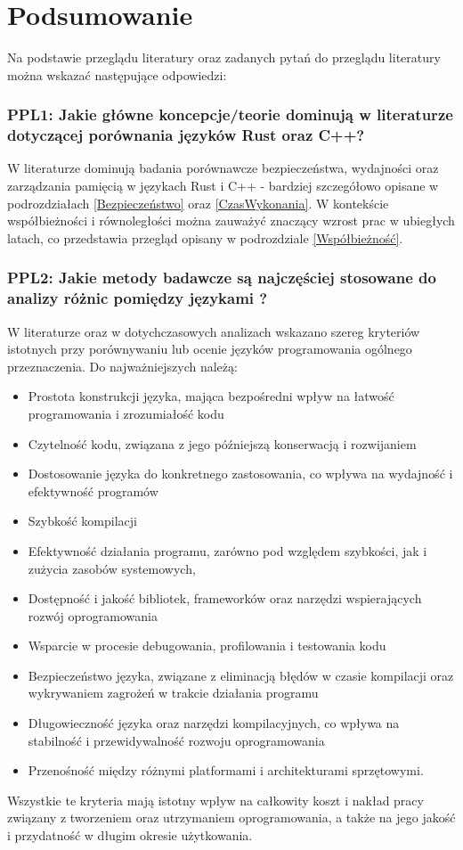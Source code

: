 \section{Podsumowanie}
Na podstawie przeglądu literatury oraz zadanych pytań do przeglądu literatury można wskazać następujące odpowiedzi:
\subsubsection{PPL1: Jakie główne koncepcje/teorie dominują w literaturze dotyczącej porównania języków Rust oraz C++?}
W literaturze dominują badania porównawcze bezpieczeństwa, wydajności oraz zarządzania pamięcią w językach Rust i C++ - bardziej szczegółowo opisane w podrozdziałach \ref{Bezpieczeństwo} oraz \ref{CzasWykonania}. W kontekście współbieżności i równoległości można zauważyć znaczący wzrost prac w ubiegłych latach, co przedstawia przegląd opisany w podrozdziale \ref{Współbieżność}.

\subsubsection{PPL2: Jakie metody badawcze są najczęściej stosowane do analizy różnic pomiędzy językami ?}
W literaturze oraz w dotychczasowych analizach \cite{LanguageComparison_1,LanguageComparison_2,LanguageComparison_3,LanguageComparison_4} wskazano szereg kryteriów istotnych przy porównywaniu lub ocenie języków programowania ogólnego przeznaczenia. Do najważniejszych należą: 
    \begin{itemize}
        \item Prostota konstrukcji języka, mająca bezpośredni wpływ na łatwość programowania i zrozumiałość kodu
        \item Czytelność kodu, związana z jego późniejszą konserwacją i rozwijaniem
        \item Dostosowanie języka do konkretnego zastosowania, co wpływa na wydajność i efektywność programów
        \item Szybkość kompilacji
        \item Efektywność działania programu, zarówno pod względem szybkości, jak i zużycia zasobów systemowych,
        \item Dostępność i jakość bibliotek, frameworków oraz narzędzi wspierających rozwój oprogramowania
        \item Wsparcie w procesie debugowania, profilowania i testowania kodu
        \item Bezpieczeństwo języka, związane z eliminacją błędów w czasie kompilacji oraz wykrywaniem zagrożeń w trakcie działania programu
        \item Długowieczność języka oraz narzędzi kompilacyjnych, co wpływa na stabilność i przewidywalność rozwoju oprogramowania
        \item Przenośność między różnymi platformami i architekturami sprzętowymi.
    \end{itemize}
    Wszystkie te kryteria mają istotny wpływ na całkowity koszt i nakład pracy związany z tworzeniem oraz utrzymaniem oprogramowania, a także na jego jakość i przydatność w długim okresie użytkowania.

